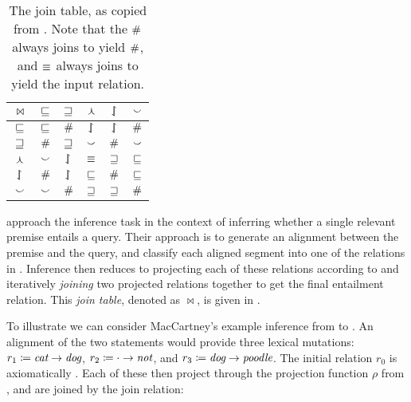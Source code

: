 %
%

\begin{table}[t]
	\begin{center}
	\begin{tabular}{|c||c|c|c|c|c|}
    \hline
    $\bowtie$ & $\sqsubseteq$ & $\sqsupseteq$ & $\curlywedge$ & $\downharpoonleft\hspace{-1.25mm}\upharpoonright$ & $\smallsmile$ \\
    \hline
    $\sqsubseteq$ & $\sqsubseteq$ & $\#$ & $\downharpoonleft\hspace{-1.25mm}\upharpoonright$ & $\downharpoonleft\hspace{-1.25mm}\upharpoonright$ & $\#$ \\
    $\sqsupseteq$ & $\#$ & $\sqsupseteq$ & $\smallsmile$ & $\#$ & $\smallsmile$ \\
    $\curlywedge$ & $\smallsmile$ & $\downharpoonleft\hspace{-1.25mm}\upharpoonright$ & $\equiv$ & $\sqsupseteq$ & $\sqsubseteq$ \\
    $\downharpoonleft\hspace{-1.25mm}\upharpoonright$ & $\#$ & $\downharpoonleft\hspace{-1.25mm}\upharpoonright$ & $\sqsubseteq$ & $\#$ & $\sqsubseteq$ \\
    $\smallsmile$ & $\smallsmile$ & $\#$ & $\sqsupseteq$ & $\sqsupseteq$ & $\#$ \\
    \hline
	\end{tabular}
	\caption{
    The join table, as copied from .
    Note that the $\#$ always joins to yield $\#$,
    and $\equiv$ always joins to yield the input relation.
		\label{tab:join}
	}
	\end{center}
\end{table}

 approach the inference task in
  the context of inferring whether a single relevant premise entails
  a query.
Their approach is to generate an alignment between the premise
  and the query, and classify each aligned segment into one of
  the relations in .
Inference then reduces to projecting each of these relations
  according to  and iteratively \textit{joining} 
  two projected relations together to get the final entailment
  relation.
This \textit{join table}, denoted as $\bowtie$, 
  is given in .

To illustrate we can consider MacCartney's example inference from
   to .
An alignment of the two statements would provide three lexical
  mutations:
    \mbox{$r_1\coloneqq\textit{cat}\rightarrow\textit{dog}$}, 
    \mbox{$r_2\coloneqq\cdot\rightarrow\textit{not}$},
    and \mbox{$r_3\coloneqq\textit{dog}\rightarrow\textit{poodle}$}.
The initial relation $r_0$ is axiomatically \equivalent.
Each of these then project through the projection function $\rho$
  from ,
  and are joined by the join relation:

